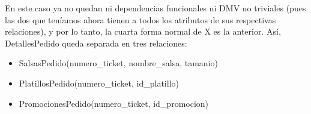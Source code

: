 \documentclass[11pt]{article}
\begin{document}
\begin{itemize}
\begin{itemize}
      \end{itemize}
      En este caso ya no quedan ni dependencias funcionales ni DMV no triviales (pues las dos que teníamos ahora tienen a todos los atributos de sus respectivas relaciones), y por lo tanto, la cuarta forma normal de X es la anterior. 
      Así, DetallesPedido queda separada en tres relaciones:
      \begin{itemize}
      \item SalsasPedido(numero\_ticket, nombre\_salsa, tamanio)
      \item PlatillosPedido(numero\_ticket, id\_platillo)
      \item PromocionesPedido(numero\_ticket, id\_promocion)
      \end{itemize}
\end{itemize}
\end{document}
